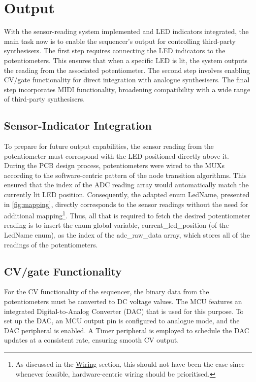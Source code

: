 \documentclass[12pt]{article}
\numberwithin{subsubsubsection}{subsubsection}
\begin{document}
\section{Output}

With the sensor-reading system implemented and LED indicators integrated, the main task now is to enable the sequencer's output for controlling third-party synthesisers. The first step requires connecting the LED indicators to the potentiometers. This ensures that when a specific LED is lit, the system outputs the reading from the associated potentiometer. The second step involves enabling CV/gate functionality for direct integration with analogue synthesisers. The final step incorporates MIDI functionality, broadening compatibility with a wide range of third-party synthesisers.

\subsection{Sensor-Indicator Integration}


To prepare for future output capabilities,  the sensor reading from the potentiometer must correspond with the LED positioned directly above it. During the PCB design process, potentiometers were wired to the MUXs according to the software-centric pattern of the node transition algorithms. This ensured that the index of the ADC reading array would automatically match the currently lit LED position. Consequently, the adapted enum LedName, presented in \autoref{fig:mapping}, directly corresponds to the sensor readings without the need for additional mapping\footnote{As discussed in the \hyperref[wiring]{Wiring} section, this should not have been the case since whenever feasible, hardware-centric wiring should be prioritised.}. Thus, all that is required to fetch the desired potentiometer reading is to insert the enum global variable, current\_led\_position (of the LedName enum), as the index of the adc\_raw\_data array, which stores all of the readings of the potentiometers.

\subsection{CV/gate Functionality}

For the CV functionality of the sequencer, the binary data from the potentiometers must be converted to DC voltage values. The MCU features an integrated Digital-to-Analog Converter (DAC) that is used for this purpose. To set up the DAC, an MCU output pin is configured to analogue mode, and the DAC peripheral is enabled. A Timer peripheral is employed to schedule the DAC updates at a consistent rate, ensuring smooth CV output.
\end{document}
